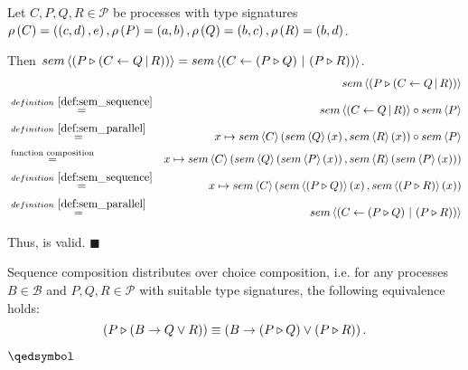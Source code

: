 \begin{myproof}
Let $C, P, Q, R \in \mathcal{P}$ be processes with type signatures $\rho \left( C \right) = \left( \left( c, d \right), e \right), \rho \left( P \right) = \left( a, b \right), \rho \left( Q \right) = \left( b, c \right), \rho \left( R \right) = \left( b, d \right)$.

Then $sem \left\langle \left( P \triangleright \left( C \gets Q \, | \, R \right) \right) \right\rangle = sem \left\langle \left( C \gets \left( P \triangleright Q \right) \, | \, \left( P \triangleright R \right) \right) \right\rangle$.
\begin{eqnarray*}
  & & \sem{\sequence{P}{\parallel{C}{Q}{R}}} \\
  & \overset{\defref{def:sem_sequence}}{=}   & \sem{\parallel{C}{Q}{R}} \circ \sem{P} \\
  & \overset{\defref{def:sem_parallel}}{=}   & x \mapsto \sem{C} \left( \sem{Q} \left( x \right), \sem{R} \left( x \right) \right) \circ \sem{P} \\
  & \overset{\text{function composition}}{=} & x \mapsto \sem{C} \left( \sem{Q} \left( \sem{P} \left( x \right) \right), \sem{R} \left( \sem{P} \left( x \right) \right) \right) \\
  & \overset{\defref{def:sem_sequence}}{=}   & x \mapsto \sem{C} \left( \sem{\sequence{P}{Q}} \left( x \right), \sem{\sequence{P}{R}} \left( x \right) \right) \\
  & \overset{\defref{def:sem_parallel}}{=}   & \sem{\parallel{C}{\sequence{P}{Q}}{\sequence{P}{R}}}
\end{eqnarray*}

\vspace*{-1em}
Thus,  is valid. \hfill$\blacksquare$
\end{myproof}


\begin{theorem}
\label{thm:distributivity_sequence_choice}
Sequence composition distributes over choice composition, i.e. for any processes $B \in \mathcal{B}$ and $P, Q, R \in \mathcal{P}$ with suitable type signatures, the following equivalence holds:
\begin{equation*}
  \left( P \triangleright \left( B \to Q \vee R \right) \right) \equiv \left( B \to \left( P \triangleright Q \right) \vee \left( P \triangleright R \right) \right).
\end{equation*}

\vspace*{-0.75em}
\hfill$\qedsymbol$
\end{theorem}

